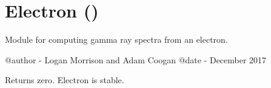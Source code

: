 \documentclass[letterpaper,10pt,english]{sphinxmanual}
\begin{document}
\begin{fulllineitems}
\begin{description}
\begin{sphinxVerbatim}[commandchars=\\\{\}]
   
     
  
    
\end{sphinxVerbatim}

\end{description}

\end{fulllineitems}



\section{Electron ()}
\label{\detokenize{modules:module-hazma.electron}}\label{\detokenize{modules:electron-hazma-electron}}
Module for computing gamma ray spectra from an electron.

@author - Logan Morrison and Adam Coogan
@date - December 2017

\begin{fulllineitems}
\label{\detokenize{modules:hazma.electron.decay_spectra}}
Returns zero. Electron is stable.

\end{fulllineitems}

\end{document}
